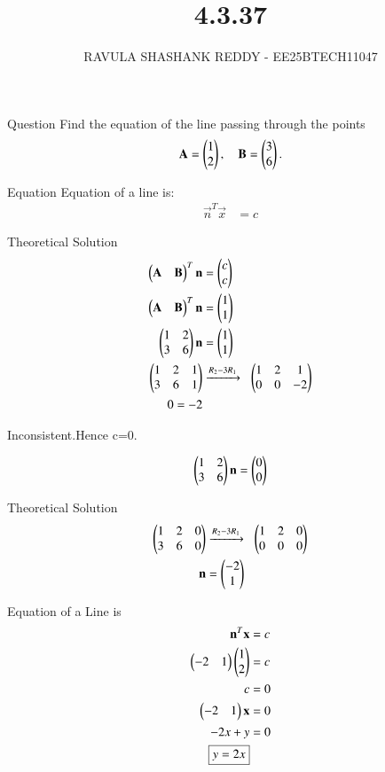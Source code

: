 \documentclass{beamer}
\title %
{4.3.37}
\author %
{RAVULA SHASHANK REDDY - EE25BTECH11047}
\begin{document}
	\frame{\titlepage}
	\begin{frame}{Question}
Find the equation of the line passing through the points  
\[
\mathbf{A} = \begin{pmatrix}1 \\ 2\end{pmatrix}, 
\quad 
\mathbf{B} = \begin{pmatrix}3 \\ 6\end{pmatrix}.
\]
\end{frame}
\begin{frame}{Equation}
Equation of a line is:
\begin{align*}
\vec{n}^T \vec{x} &= c 
    \end{align*}
\end{frame}
\begin{frame}{Theoretical Solution}
   \begin{align}
\begin{pmatrix}\mathbf{A}&\mathbf{B}\end{pmatrix}^T\mathbf{n} &= \begin{pmatrix}c\\c\end{pmatrix}\\
\begin{pmatrix}\mathbf{A}&\mathbf{B}\end{pmatrix}^T\mathbf{n} &= \begin{pmatrix}1\\1\end{pmatrix}\\
\begin{pmatrix}1 & 2 \\ 3 & 6\end{pmatrix}\mathbf{n} &= \begin{pmatrix}1 \\ 1\end{pmatrix}\\ 
\begin{pmatrix}1 & 2 & 1 \\ 3 & 6 & 1\end{pmatrix} & 
\xrightarrow{R_2 - 3R_1}\;\;
\begin{pmatrix}1 & 2 & 1 \\ 0 & 0 & -2\end{pmatrix} \\
0=-2
\end{align}
\begin{center}
Inconsistent.Hence c=0.
\end{center}

\begin{align}
\begin{pmatrix}1 & 2  \\ 3 & 6 \end{pmatrix}\mathbf{n}= \begin{pmatrix}0 \\ 0\end{pmatrix}\\
\end{align}

\end{frame}
\begin{frame}{Theoretical Solution}
\begin{align}
\begin{pmatrix}1 & 2 & 0 \\ 3 & 6 & 0\end{pmatrix} & 
\xrightarrow{R_2 - 3R_1}\;\;
\begin{pmatrix}1 & 2 & 0 \\ 0 & 0 & 0\end{pmatrix} \\
\mathbf{n} &= \begin{pmatrix}-2 \\ 1\end{pmatrix}
\end{align}

Equation of a Line is
\begin{align}
\mathbf{n}^T \mathbf{x} &= c \\
\begin{pmatrix}-2 & 1\end{pmatrix}\begin{pmatrix}1 \\ 2\end{pmatrix} &= c \\
c &= 0 \\
\begin{pmatrix}-2 & 1\end{pmatrix}\mathbf{x} &= 0 \\
-2x + y &= 0 \\
\boxed{y = 2x}
\end{align}
\end{frame}
\end{document}
